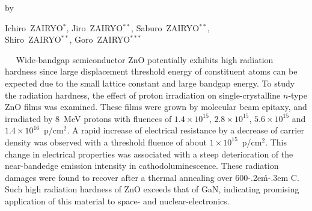 \documentclass{ujarticle}
\def\degC{\kern-.2em\r{}\kern-.3em C}   %
\begin{document}
\vspace*{-4mm}   %
\begin{center}
{\small by}
\end{center}

\vspace*{-2mm}   %
\begin{center}
 {\fontsize{10.5pt}{0pt}\selectfont  %
Ichiro\ Z{\fontsize{7pt}{0pt}\selectfont AIRYO}$^{\ast}$, 
Jiro\ Z{\fontsize{7pt}{0pt}\selectfont AIRYO}$^{\ast\ast}$, 
Saburo\ Z{\fontsize{7pt}{0pt}\selectfont AIRYO}$^{\ast\ast}$, 
\\
Shiro\ Z{\fontsize{7pt}{0pt}\selectfont AIRYO}$^{\ast\ast}$, 
Goro\ Z{\fontsize{7pt}{0pt}\selectfont AIRYO}$^{\ast\ast\ast}$
}
\end{center}


\vspace*{0mm}   %
\begin{center}
\begin{minipage}{160mm}
\baselineskip 12pt%
\setlength{\parindent}{4mm}　%
{\fontsize{9.5pt}{0pt}\selectfont   %
Wide-bandgap semiconductor ZnO potentially exhibits high radiation hardness since large displacement threshold energy of constituent atoms can be expected due to the small lattice constant and large bandgap energy. To study the radiation hardness, the effect of proton irradiation on single-crystalline $n$-type ZnO films was examined. These films were grown by molecular beam epitaxy, and irradiated by $8$~MeV protons with fluences of
$1.4\times 10^{15}$, $2.8\times 10^{15}$, $5.6\times 10^{15}$ and $1.4\times 10^{16}$~p/cm$^2$. A rapid increase of electrical resistance by a decrease of carrier density was observed with a threshold fluence of about $1\times 10^{15}$~p/cm$^2$. This change in electrical properties was associated with a steep deterioration of the near-bandedge emission intensity in cathodoluminescence. These radiation damages were found to recover after a thermal annealing over $600$\degC. Such high radiation hardness of ZnO exceeds that of GaN, indicating promising application of this material to space- and nuclear-electronics. 
}
\end{minipage}
\end{center}
\end{document}
